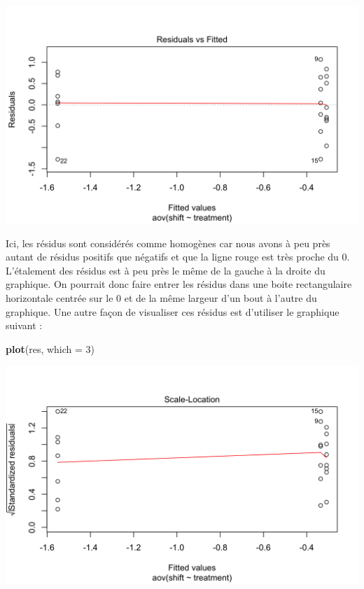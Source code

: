 \documentclass[a4paperpaper,]{article}
\newenvironment{Shaded}{\begin{snugshade}}{\end{snugshade}}
\newcommand{\DataTypeTok}[1]{\textcolor[rgb]{0.00,0.34,0.68}{#1}}
\newcommand{\DecValTok}[1]{\textcolor[rgb]{0.69,0.50,0.00}{#1}}
\newcommand{\KeywordTok}[1]{\textcolor[rgb]{0.12,0.11,0.11}{\textbf{#1}}}
\newcommand{\NormalTok}[1]{\textcolor[rgb]{0.12,0.11,0.11}{#1}}
\begin{document}
\begin{center}\includegraphics[width=0.9\linewidth]{figure/unnamed-chunk-80-1} \end{center}

Ici, les résidus sont considérés comme homogènes car nous avons à peu près autant de résidus positifs que négatifs et que la ligne rouge est très proche du 0. L'étalement des résidus est à peu près le même de la gauche à la droite du graphique. On pourrait donc faire entrer les résidus dans une boite rectangulaire horizontale centrée sur le 0 et de la même largeur d'un bout à l'autre du graphique. Une autre façon de visualiser ces résidus est d'utiliser le graphique suivant :

\begin{Shaded}
\begin{Highlighting}[]
\KeywordTok{plot}\NormalTok{(res, }\DataTypeTok{which =} \DecValTok{3}\NormalTok{)}
\end{Highlighting}
\end{Shaded}

\begin{center}\includegraphics[width=0.9\linewidth]{figure/unnamed-chunk-81-1} \end{center}
\end{document}
